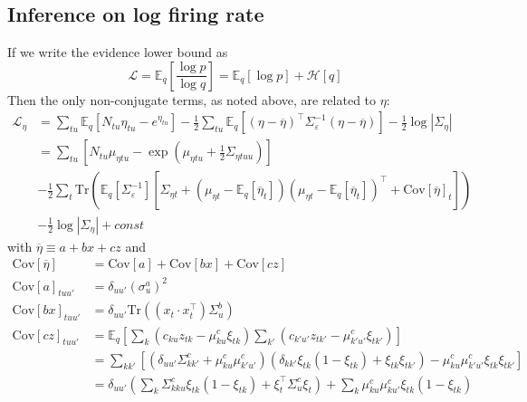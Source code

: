 \documentclass[11pt]{article}
\begin{document}
\subsection{Inference on log firing rate}
If we write the evidence lower bound as
\begin{equation}
    \mathcal{L} = \mathbb{E}_q \left[ \frac{\log p}{\log q}\right] =
    \mathbb{E}_q[\log p] + \mathcal{H}[q]
\end{equation}
Then the only non-conjugate terms, as noted above, are related to $\eta$:
\begin{align}
    \mathcal{L}_\eta &=
    \sum_{tu} \mathbb{E}_q[N_{tu} \eta_{tu} - e^{\eta_{tu}}]
    - \frac{1}{2} \sum_{tu} \mathbb{E}_q \left[
    (\eta - \overline{\eta})^\top \Sigma_\varepsilon^{-1}(\eta - \overline{\eta}) \right]
    - \frac{1}{2} \log |\Sigma_\eta| \\
    &= \sum_{tu} \left[ N_{tu} \mu_{\eta tu} -
    \exp\left(\mu_{\eta tu} + \frac{1}{2} \Sigma_{\eta tuu} \right)\right] \\
    \label{eta_cov}
    &- \frac{1}{2} \sum_{t} \mathrm{Tr}\left(
    \mathbb{E}_q[\Sigma_\varepsilon^{-1}]
    \left[ \Sigma_{\eta t} + (\mu_{\eta t} - \mathbb{E}_q[\overline{\eta}_{t}])
    (\mu_{\eta t} - \mathbb{E}_q[\overline{\eta}_{t}])^\top
    + \mathrm{Cov}[\overline{\eta}]_{t}\right] \right) \\
    &- \frac{1}{2} \log |\Sigma_\eta| + const
\end{align}
with $\overline{\eta} \equiv a + bx + cz$ and
\begin{align}
    \mathrm{Cov}[\overline{\eta}] &= \mathrm{Cov}[a] + \mathrm{Cov}[bx] + \mathrm{Cov}[cz] \\
    \mathrm{Cov}[a]_{tuu'} &= \delta_{uu'}(\sigma^a_u)^2 \\
    \mathrm{Cov}[bx]_{tuu'} &= \delta_{uu'}\mathrm{Tr}\left((x_t\cdot x_t^\top) \Sigma^b_{u}\right) \\
    \mathrm{Cov}[cz]_{tuu'} &= \mathbb{E}_q\left[\sum_{k}\left( c_{ku} z_{tk} - \mu^c_{ku}\xi_{tk} \right)\sum_{k'}\left( c_{k'u'} z_{tk'} - \mu^c_{k'u'}\xi_{tk'} \right)\right] \\
    &= \sum_{kk'}\left[\left(\delta_{uu'}\Sigma^c_{kk'} + \mu^c_{ku} \mu^c_{k'u'} \right)\left(\delta_{kk'}\xi_{tk}(1 - \xi_{tk}) + \xi_{tk}\xi_{tk'}\right) - \mu^c_{ku}\mu^c_{k'u'}\xi_{tk}\xi_{tk'} \right] \\
    &= \delta_{uu'}\left(\sum_k \Sigma^c_{kku} \xi_{tk} (1 - \xi_{tk}) + \xi_t^\top \Sigma_u^c \xi_t\right) + \sum_k \mu^c_{ku}\mu^c_{ku'}\xi_{tk}(1 - \xi_{tk})
\end{align}
\end{document}
